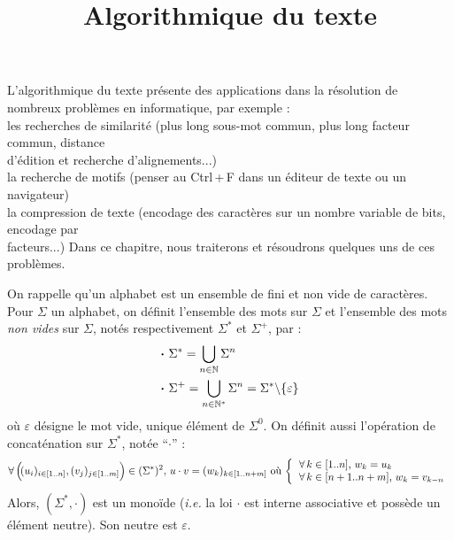 
\usepackage{euscript}
\DeclareMathOperator{\argormax}{(arg)max}
\DeclareMathOperator{\val}{val}


	
\title{Algorithmique du texte}


L'algorithmique du texte présente des applications dans la résolution de nombreux problèmes en informatique, par exemple : \\
	 \bdot les recherches de similarité (plus long sous-mot commun, plus long facteur commun, distance\\  d'édition et recherche d'alignements...) \\
	 \bdot la recherche de motifs (penser au \textsf{Ctrl\,+\,F} dans un éditeur de texte ou un navigateur) \\
	 \bdot la compression de texte (encodage des caractères sur un nombre variable de bits, encodage par \\  facteurs...) \nt
Dans ce chapitre, nous traiterons et résoudrons quelques uns de ces problèmes.

\eqskip{3mm}
\begin{Rappel}
	On rappelle qu'un alphabet est un ensemble de fini et non vide de caractères. Pour \(\Sigma\) un alphabet, on définit l'ensemble des mots sur \(\Sigma\) et l'ensemble des mots \emph{non vides} sur \(\Sigma\), notés respectivement \(\Sigma^*\) et \(\Sigma^+\), par :
		\begin{align*}
			& \text{\(\bm{\cdot}\) } \Sigma^* = \bigcup_{n\in\mathbb{N}} \Sigma^n \\
			& \text{\(\bm{\cdot}\) } \Sigma^+ = \bigcup_{n\in\mathbb{N}^*} \Sigma^n = \Sigma^*\backslash\{\varepsilon\}
		\end{align*}
	où \(\varepsilon\) désigne le mot vide, unique élément de \(\Sigma^0\). \nt
	\colsep{1.5pt}
	\eqskip{2mm}
	On définit aussi l'opération de concaténation sur \(\Sigma^*\), notée ``\(\cdot\)'' :
		\[
			\forall\left(\!(u_i)_{i\in[1..n]}, (v_j)_{j\in[1..m]}\right)\in(\Sigma^*)^2, \,u\cdot v = (w_k)_{k\in[1..n+m]} \text{ où}\,
			\left\{ \begin{tabular}[h]{l}
				\(\forall\,k\in[1..n]\), \(w_k = u_k\) \\
				\(\forall\,k\in[n+1..n+m]\), \(w_k = v_{k-n}\)
			\end{tabular} \right.
		\]
	Alors, \((\Sigma^*,\cdot)\) est un monoïde (\emph{i.e.} la loi \(\cdot\) est interne associative et possède un élément neutre). Son neutre est \(\varepsilon\).
\end{Rappel}

